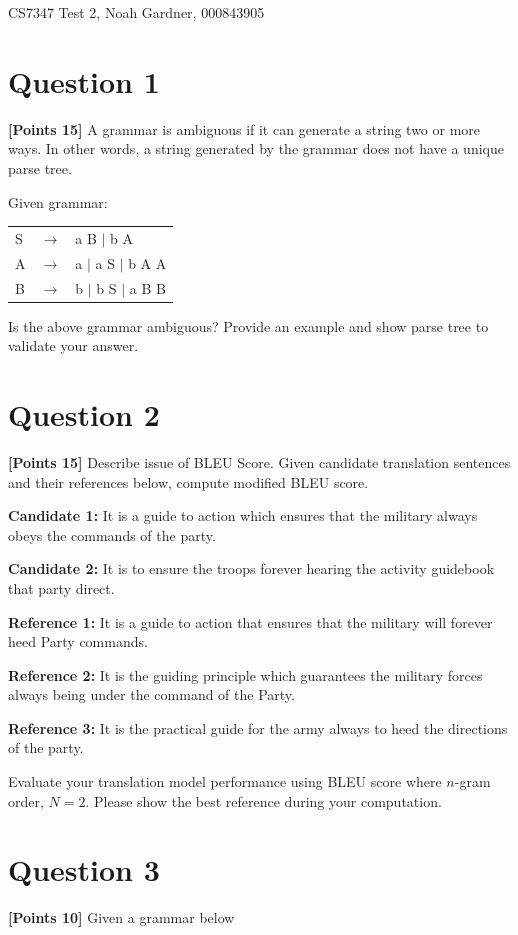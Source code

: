 \documentclass[12pt]{article}
\newcommand\n{\newline}
\begin{document}
CS7347 Test 2, Noah Gardner, 000843905\n

\section*{Question 1}
\textbf{[Points 15]} A grammar is ambiguous if it can generate a
string two or more ways. In other words, a string generated by the
grammar does not have a unique parse tree.

Given grammar:

\begin{tabular}{lll}
      S & $\rightarrow$ & a B $|$ b A         \\
      A & $\rightarrow$ & a $|$ a S $|$ b A A \\
      B & $\rightarrow$ & b $|$ b S $|$ a B B \\
\end{tabular}

Is the above grammar ambiguous? Provide an example and show parse tree
to validate your answer.

\newpage
\section*{Question 2}
\textbf{[Points 15]} Describe issue of BLEU Score. Given candidate
translation sentences and their references below, compute modified BLEU
score.

\textbf{Candidate 1:} It is a guide to action which ensures that the
military always obeys the commands of the party.

\textbf{Candidate 2:} It is to ensure the troops forever hearing the
activity guidebook that party direct.

\textbf{Reference 1:} It is a guide to action that ensures that the
military will forever heed Party commands.

\textbf{Reference 2:} It is the guiding principle which guarantees
the military forces always being under the command of the Party.

\textbf{Reference 3:} It is the practical guide for the army always to
heed the directions of the party.

Evaluate your translation model performance using BLEU score where
$n$-gram order, $N=2$. Please show the best reference during your
computation.

\newpage
\section*{Question 3}
\textbf{[Points 10]} Given a grammar below
\end{document}
